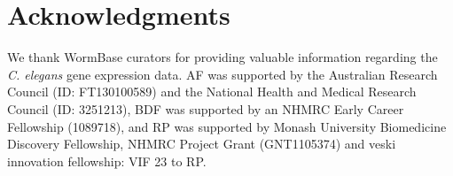 \documentclass[10pt,letterpaper]{article}
\begin{document}
{%


\section*{Acknowledgments}
We thank WormBase curators for providing valuable information regarding the \emph{C. elegans} gene expression data.
AF was supported by the Australian Research Council (ID: FT130100589) and the National Health and Medical Research Council (ID: 3251213),
BDF was supported by an NHMRC Early Career Fellowship (1089718), and
RP was supported by Monash University Biomedicine Discovery Fellowship, NHMRC Project Grant (GNT1105374) and veski innovation fellowship: VIF 23 to RP.

\nolinenumbers

%
%
%




}
\end{document}
